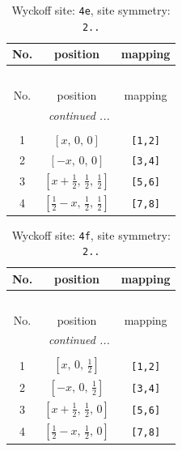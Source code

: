 \documentclass[fleqn,8pt]{jsarticle}
\begin{document}
\begin{longtable}{ccc}
\caption{Wyckoff site: {\tt 4e}, site symmetry: {\tt 2..}}
 \\
 \hline \hline
No. & position & mapping \\ \hline \endfirsthead

\multicolumn{2}{l}{\tablename\ \thetable{}} \\
 \hline \hline
No. & position & mapping \\ \hline \endhead

 \hline \hline
\multicolumn{2}{r}{\footnotesize\it continued ...} \\ \endfoot

 \hline \hline
\multicolumn{2}{r}{} \\ \endlastfoot

1 & $\left[ x,\, 0,\, 0 \right]$ & {\tt [1,2]} \\ \hline
2 & $\left[ - x,\, 0,\, 0 \right]$ & {\tt [3,4]} \\ \hline
3 & $\left[ x + \frac{1}{2},\, \frac{1}{2},\, \frac{1}{2} \right]$ & {\tt [5,6]} \\ \hline
4 & $\left[ \frac{1}{2} - x,\, \frac{1}{2},\, \frac{1}{2} \right]$ & {\tt [7,8]} \\
\end{longtable}
\renewcommand{\arraystretch}{1.2}
\begin{longtable}{ccc}
\caption{Wyckoff site: {\tt 4f}, site symmetry: {\tt 2..}}
 \\
 \hline \hline
No. & position & mapping \\ \hline \endfirsthead

\multicolumn{2}{l}{\tablename\ \thetable{}} \\
 \hline \hline
No. & position & mapping \\ \hline \endhead

 \hline \hline
\multicolumn{2}{r}{\footnotesize\it continued ...} \\ \endfoot

 \hline \hline
\multicolumn{2}{r}{} \\ \endlastfoot

1 & $\left[ x,\, 0,\, \frac{1}{2} \right]$ & {\tt [1,2]} \\ \hline
2 & $\left[ - x,\, 0,\, \frac{1}{2} \right]$ & {\tt [3,4]} \\ \hline
3 & $\left[ x + \frac{1}{2},\, \frac{1}{2},\, 0 \right]$ & {\tt [5,6]} \\ \hline
4 & $\left[ \frac{1}{2} - x,\, \frac{1}{2},\, 0 \right]$ & {\tt [7,8]} \\
\end{longtable}
\end{document}
